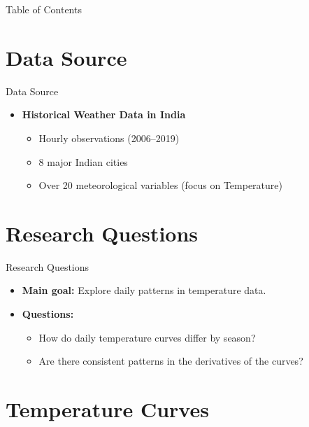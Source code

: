 \documentclass[svgnames, 12pt]{beamer}
\begin{document}
\begin{frame}{Table of Contents}
\tableofcontents
\end{frame}

\section{Data Source}

\begin{frame}{Data Source}
			\begin{itemize}
		\item \textbf{Historical Weather Data in India}
		\begin{itemize}
			\item Hourly observations (2006--2019)
			\item 8 major Indian cities
			\item Over 20 meteorological variables (focus on Temperature)
		\end{itemize}
			\end{itemize}
\end{frame}

\section{Research Questions}

\begin{frame}{Research Questions}
	\begin{itemize}
		\item \textbf{Main goal:} Explore daily patterns in temperature data.
		\item \textbf{Questions:}
		\begin{itemize}
			\item How do daily temperature curves differ by season?
			\item Are there consistent patterns in the derivatives of the curves?
		\end{itemize}
	\end{itemize}
\end{frame}

\section{Temperature Curves}
\end{document}
